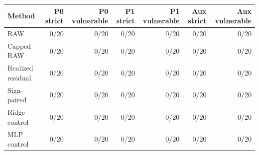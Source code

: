 \begin{tabular}{lrrrrrr}
\toprule
Method & P0 strict & P0 vulnerable & P1 strict & P1 vulnerable & Aux strict & Aux vulnerable \\
\midrule
RAW & 0/20 & 0/20 & 0/20 & 0/20 & 0/20 & 0/20 \\
Capped RAW & 0/20 & 0/20 & 0/20 & 0/20 & 0/20 & 0/20 \\
Realized residual & 0/20 & 0/20 & 0/20 & 0/20 & 0/20 & 0/20 \\
Sign-paired & 0/20 & 0/20 & 0/20 & 0/20 & 0/20 & 0/20 \\
Ridge control & 0/20 & 0/20 & 0/20 & 0/20 & 0/20 & 0/20 \\
MLP control & 0/20 & 0/20 & 0/20 & 0/20 & 0/20 & 0/20 \\
\bottomrule
\end{tabular}
